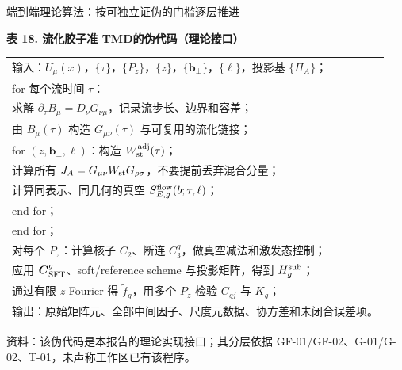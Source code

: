 \documentclass[UTF8,aspectratio=169,11pt]{ctexbeamer}
\newcommand{\source}[1]{%
  \par\vspace{-0.08em}%
  \noindent\parbox[t]{0.97\linewidth}{\raggedright\scriptsize\color{muted}资料：#1}\par}
\newcommand{\ad}{\mathrm{adj}}
\begin{document}
\begin{frame}[t]{端到端理论算法：按可独立证伪的门槛逐层推进}
  \begin{center}
  \textbf{表 18. 流化胶子准 TMD的伪代码（理论接口）}
  \vspace{0.12em}
  \small
  \begin{tabular}{@{}p{\linewidth}@{}}
    \toprule
    输入：$U_\mu(x)$，$\{\tau\}$，$\{P_z\}$，$\{z\}$，$\{\boldsymbol b_\perp\}$，$\{\ell\}$，投影基 $\{\Pi_A\}$；\\
    for 每个流时间 $\tau$：\\
    \quad 求解 $\partial_\tau B_\mu=D_\nu G_{\nu\mu}$，记录流步长、边界和容差；\\
    \quad 由 $B_\mu(\tau)$ 构造 $G_{\mu\nu}(\tau)$ 与可复用的流化链接；\\
    \quad for $(z,\boldsymbol b_\perp,\ell)$：构造 $W_{\rm st}^{\ad}(\tau)$；\\
    \qquad 计算所有 $J_A=G_{\mu\nu}W_{\rm st}G_{\rho\sigma}$，不要提前丢弃混合分量；\\
    \qquad 计算同表示、同几何的真空 $S_{E,g}^{\rm flow}(b;\tau,\ell)$；\\
    \quad end for；\\
    end for；\\
    对每个 $P_z$：计算核子 $C_2$、断连 $C_3^g$，做真空减法和激发态控制；\\
    应用 $\boldsymbol C_{\rm SFT}^g$、soft/reference scheme 与投影矩阵，得到 $H_g^{\rm sub}$；\\
    通过有限 $z$ Fourier 得 $\widetilde f_g$，用多个 $P_z$ 检验 $C_{gj}$ 与 $K_g$；\\
    输出：原始矩阵元、全部中间因子、尺度元数据、协方差和未闭合误差项。\\
    \bottomrule
  \end{tabular}
  \end{center}
  \source{该伪代码是本报告的理论实现接口；其分层依据 GF-01/GF-02、G-01/G-02、T-01，未声称工作区已有该程序。}
\end{frame}
\end{document}
